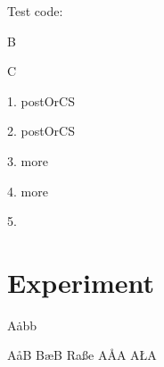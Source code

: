 \documentclass[12pt]{amsart}
\begin{document}
\let\CNLexpand=\ignoreOptionOrCS
\let\CNLnoexpand=\ignoreOptionOrCS
\let\CNLdelete=\ignoreOptionOrCS
\let\CNLcustom=\ignoreOptionOrCSS

Test code:

\ignoreOptionAndCS[3]\onearg
B

\ignoreOne\onearg C


1. \ignoreOptionOrCS\onearg postOrCS


2.  \ignoreOptionOrCS[4]\onearg postOrCS 

3. \ignoreOptionOrCSS[3] more

4. \ignoreOptionOrCSS{} more

5.

\CNLdelete\alpha
\CNLexpand\beta
\CNLnoexpand\gamma
\CNLcustom{}

\CNLdelete[1]\alpha
\CNLexpand[2]\beta
\CNLnoexpand[3]\gamma
\CNLcustom[4]

\section{Experiment}

A\.{a}bb

A{\aa}B
B{\ae}B
Ra{\ss}e
A{\AA}A
A{\L}A
\end{document}
